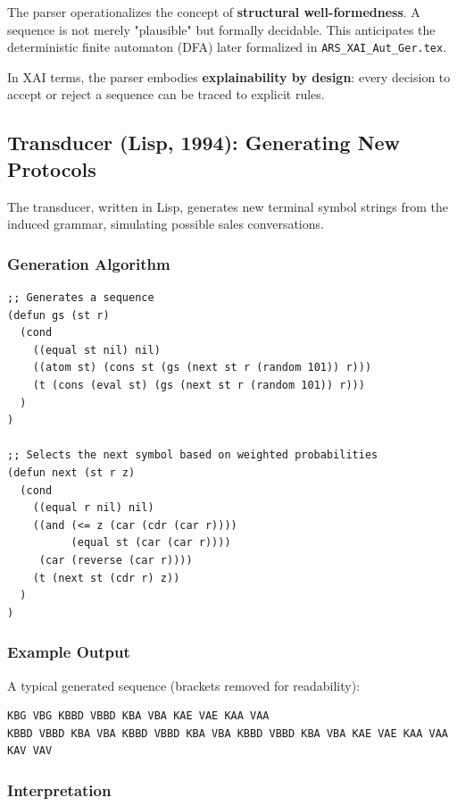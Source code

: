 \documentclass[12pt,a4paper]{article}
\begin{document}
The parser operationalizes the concept of \textbf{structural well-formedness}. 
A sequence is not merely "plausible" but formally decidable. This anticipates 
the deterministic finite automaton (DFA) later formalized in 
\texttt{ARS\_XAI\_Aut\_Ger.tex}.

In XAI terms, the parser embodies \textbf{explainability by design}: every 
decision to accept or reject a sequence can be traced to explicit rules.

\subsection{Transducer (Lisp, 1994): Generating New Protocols}

The transducer, written in Lisp, generates new terminal symbol strings from 
the induced grammar, simulating possible sales conversations.

\subsubsection{Generation Algorithm}

\begin{lstlisting}[caption=Transducer in Lisp]
;; Generates a sequence
(defun gs (st r)
  (cond
    ((equal st nil) nil)
    ((atom st) (cons st (gs (next st r (random 101)) r)))
    (t (cons (eval st) (gs (next st r (random 101)) r)))
  )
)

;; Selects the next symbol based on weighted probabilities
(defun next (st r z)
  (cond
    ((equal r nil) nil)
    ((and (<= z (car (cdr (car r)))) 
          (equal st (car (car r))))
     (car (reverse (car r))))
    (t (next st (cdr r) z))
  )
)
\end{lstlisting}

\subsubsection{Example Output}

A typical generated sequence (brackets removed for readability):

\begin{verbatim}
KBG VBG KBBD VBBD KBA VBA KAE VAE KAA VAA 
KBBD VBBD KBA VBA KBBD VBBD KBA VBA KBBD VBBD KBA VBA KAE VAE KAA VAA 
KAV VAV
\end{verbatim}

\subsubsection{Interpretation}
\end{document}
